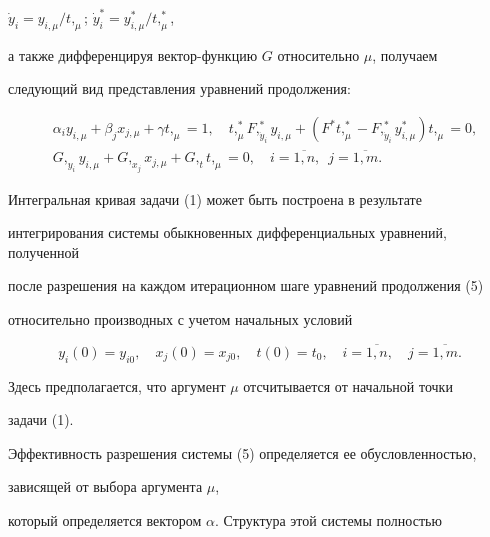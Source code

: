 \begin{pf}
$\Dot y_i=y_{i,\mu}/t,_\mu$; $\Dot y_i^*=y_{i,\mu}^*/t,_\mu^*$,


а также дифференцируя вектор-функцию $G$ относительно $\mu$, получаем


следующий вид представления уравнений продолжения:


\begin{equation}


\begin{split}


& \alpha_iy_{i,\mu}+\beta_jx_{j,\mu}+\gamma t,_\mu=1,\quad


t,_\mu^*F,_{\Dot y_i}^*y_{i,\mu}+(F^*t,_\mu^*-F,_{\Dot y_i}^*


y_{i,\mu}^*)t,_\mu=0,\\


& G,_{y_i}y_{i,\mu}+G,_{x_j}x_{j,\mu}+G,_tt,_\mu=0,\quad


i=\overline{1, n},\; \ j=\overline{1,m}.


\end{split}


\end{equation}





Интегральная кривая задачи (1) может быть построена в результате


интегрирования системы обыкновенных дифференциальных уравнений, полученной


после разрешения на каждом итерационном шаге уравнений продолжения  (5)


относительно производных с учетом начальных условий


\begin{equation}


y_i(0)=y_{i0},\quad x_j(0)=x_{j0},\quad t(0)=t_0,\quad


i=\overline{1, n},\quad j=\overline{1, m}.


\end{equation}


Здесь предполагается, что аргумент $\mu$ отсчитывается от начальной точки


задачи (1).





Эффективность разрешения системы (5) определяется ее обусловленностью,


зависящей от выбора аргумента $\mu$,


который определяется вектором $\alpha$. Структура этой системы полностью



\end{pf}
